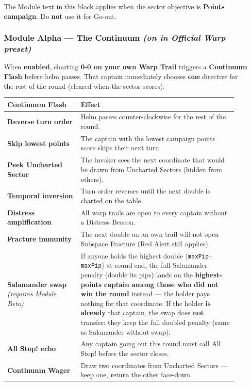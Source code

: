 \documentclass[11pt]{article}
\begin{document}
The Module text in this block applies when the sector objective is
\textbf{Points campaign}. Do \textbf{not} use it for Go-out.

\subsubsection{\texorpdfstring{Module Alpha --- The Continuum \emph{(on
in Official Warp
preset)}}{Module Alpha --- The Continuum (on in Official Warp preset)}}\label{module-alpha--the-continuum-on-in-official-warp-preset}

When \textbf{enabled}, charting \textbf{0-0 on your own Warp Trail}
triggers a \textbf{Continuum Flash} before helm passes. That captain
immediately chooses \textbf{one} directive for the rest of the round
(cleared when the sector scores):

\begin{longtable}[]{@{}>{\raggedright\arraybackslash}p{0.30\linewidth}>{\raggedright\arraybackslash}p{0.64\linewidth}@{}}
\toprule\noalign{}
Continuum Flash & Effect \\
\midrule\noalign{}
\endhead
\bottomrule\noalign{}
\endlastfoot
\textbf{Reverse turn order} & Helm passes counter-clockwise for the rest
of the round. \\
\textbf{Skip lowest points} & The captain with the lowest campaign
points score skips their next turn. \\
\textbf{Peek Uncharted Sector} & The invoker sees the next coordinate that
would be drawn from Uncharted Sectors (hidden from others). \\
\textbf{Temporal inversion} & Turn order reverses until the next double
is charted on the table. \\
\textbf{Distress amplification} & All warp trails are open to every
captain without a Distress Beacon. \\
\textbf{Fracture immunity} & The next double on an own trail will not
open Subspace Fracture (Red Alert still applies). \\
\textbf{Salamander swap} \emph{(requires Module Beta)} & If anyone holds
the highest double (\texttt{maxPip-maxPip}) at round end, the full
Salamander penalty (double its pips) lands on the
\textbf{highest-points captain among those who did not win the round}
instead --- the holder pays nothing for that coordinate.
If the holder \textbf{is already} that captain, the swap does
\textbf{not} transfer: they keep the full doubled penalty (same as
Salamander without swap). \\
\textbf{All Stop! echo} & Any captain going out this round must call All
Stop! before the sector closes. \\
\textbf{Continuum Wager} & Draw two coordinates from Uncharted
Sectors --- keep one, return the other face-down. \\
\end{longtable}
\end{document}
